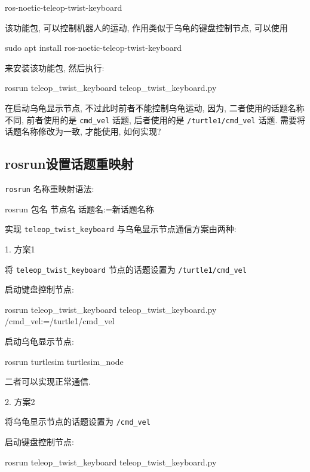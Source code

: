 \documentclass[openany, fontset=windowsold]{ctexbook}
\theoremstyle{kaiti}
\theoremstyle{normal}
\begin{document}
\begin{bash}
  ros-noetic-teleop-twist-keyboard
\end{bash}

该功能包, 可以控制机器人的运动, 作用类似于乌龟的键盘控制节点, 可以使用 

\begin{bash}
  sudo apt install ros-noetic-teleop-twist-keyboard 
\end{bash}

来安装该功能包, 然后执行: 

\begin{bash}
  rosrun teleop_twist_keyboard teleop_twist_keyboard.py
\end{bash}

在启动乌龟显示节点, 不过此时前者不能控制乌龟运动, 因为, 二者使用的话题名称不同, 前者使用的是 \verb|cmd_vel| 话题, 后者使用的是 \verb|/turtle1/cmd_vel| 话题. 需要将话题名称修改为一致, 才能使用, 如何实现? 

\subsection{rosrun设置话题重映射}

\verb|rosrun| 名称重映射语法: 

\begin{bash}
  rosrun 包名 节点名 话题名:=新话题名称
\end{bash}

实现 \verb|teleop_twist_keyboard| 与乌龟显示节点通信方案由两种: 

1. 方案1

将 \verb|teleop_twist_keyboard| 节点的话题设置为 \verb|/turtle1/cmd_vel|

启动键盘控制节点:

\begin{bash}
  rosrun teleop_twist_keyboard teleop_twist_keyboard.py /cmd_vel:=/turtle1/cmd_vel
\end{bash}

启动乌龟显示节点: 

\begin{bash}
  rosrun turtlesim turtlesim_node
\end{bash}

二者可以实现正常通信.

2. 方案2

将乌龟显示节点的话题设置为 \verb|/cmd_vel|

启动键盘控制节点:

\begin{bash}
  rosrun teleop_twist_keyboard teleop_twist_keyboard.py
\end{bash}
\end{document}
